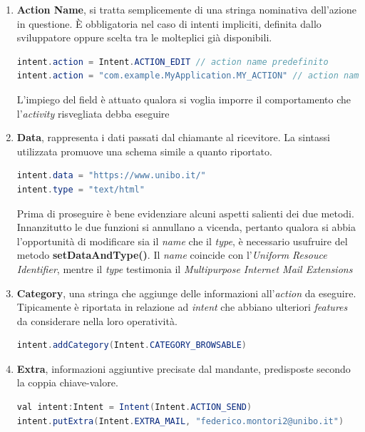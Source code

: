 \documentclass{article}
\begin{document}
\begin{enumerate}
    \itemsep0em
    \renewcommand{\labelenumi}{ }
    \item \textbf{Action Name}, si tratta semplicemente di una stringa nominativa dell'azione in questione. È obbligatoria nel caso di intenti impliciti, definita dallo sviluppatore oppure scelta tra le molteplici già disponibili.
    \begin{lstlisting}[language=JAVA, title=Definizione del field action name]
intent.action = Intent.ACTION_EDIT // action name predefinito
intent.action = "com.example.MyApplication.MY_ACTION" // action name personalizzato
    \end{lstlisting}
    L'impiego del field è attuato qualora si voglia imporre il comportamento che l'\textit{activity} risvegliata debba eseguire
    \item \textbf{Data}, rappresenta i dati passati dal chiamante al ricevitore. La sintassi utilizzata promuove una schema simile a quanto riportato.
    \begin{lstlisting}[language=JAVA, title=Definizone del field data]
intent.data = "https://www.unibo.it/"
intent.type = "text/html"
    \end{lstlisting}
    Prima di proseguire è bene evidenziare alcuni aspetti salienti dei due metodi. Innanzitutto le due funzioni si annullano a vicenda, pertanto qualora si abbia l'opportunità di modificare sia il \textit{name} che il \textit{type}, è necessario usufruire del metodo \textbf{setDataAndType()}. Il \textit{name} coincide con l'\textit{Uniform Resouce Identifier}, mentre il \textit{type} testimonia il \textit{Multipurpose Internet Mail Extensions} 
    \item \textbf{Category}, una stringa che aggiunge delle informazioni all'\textit{action} da eseguire. Tipicamente è riportata in relazione ad \textit{intent} che abbiano ulteriori \textit{features} da considerare nella loro operatività.
    \begin{lstlisting}[language=JAVA, title=Definizone del field category]
intent.addCategory(Intent.CATEGORY_BROWSABLE)
    \end{lstlisting}
    \item \textbf{Extra}, informazioni aggiuntive precisate dal mandante, predisposte secondo la coppia chiave-valore.
    \begin{lstlisting}[language=JAVA, title=Definizone del field extra]
val intent:Intent = Intent(Intent.ACTION_SEND)
intent.putExtra(Intent.EXTRA_MAIL, "federico.montori2@unibo.it")
    \end{lstlisting}

\end{enumerate}
\end{document}
